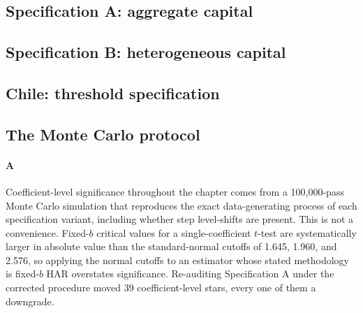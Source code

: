 \subsection{Specification A: aggregate capital}









\subsection{Specification B: heterogeneous capital}









\subsection{Chile: threshold specification}



\subsection{The Monte Carlo protocol}

\paragraph{A}
Coefficient-level significance throughout the chapter comes from a 100,000-pass Monte Carlo simulation that reproduces the exact data-generating process of each specification variant, including whether step level-shifts are present. This is not a convenience. Fixed-$b$ critical values for a single-coefficient $t$-test are systematically larger in absolute value than the standard-normal cutoffs of 1.645, 1.960, and 2.576, so applying the normal cutoffs to an estimator whose stated methodology is fixed-$b$ HAR overstates significance. Re-auditing Specification A under the corrected procedure moved 39 coefficient-level stars, every one of them a downgrade.

